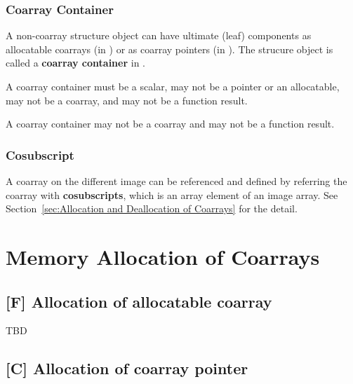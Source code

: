 \subsubsection*{Coarray Container}

A non-coarray structure object can have ultimate (leaf) components as 
allocatable coarrays (in {\XMPF}) or as coarray pointers (in {\XMPC}).
The strucure object is called a {\bf coarray container} in {\XMP}.

{\onlyF} A coarray container must be a scalar, may not be a pointer
or an allocatable, may not be a coarray, and may not be a function result.

{\onlyC} A coarray container may not be a coarray and may not be a function
result.


\subsubsection*{Cosubscript}
A coarray on the different image can be referenced and defined
by referring the coarray with {\bf cosubscripts}, which
is an array element of an image array.
See Section~\ref{sec:Allocation and Deallocation of Coarrays} for the detail.








\section{Memory Allocation of Coarrays}
\label{sec:Memory Allocation of Coarrays}

\subsection{[F] Allocation of allocatable coarray}
\label{sec:Allocation of allocatable coarray}

TBD

\subsection{[C] Allocation of coarray pointer}
\label{sec:Allocation of coarray pointer}

